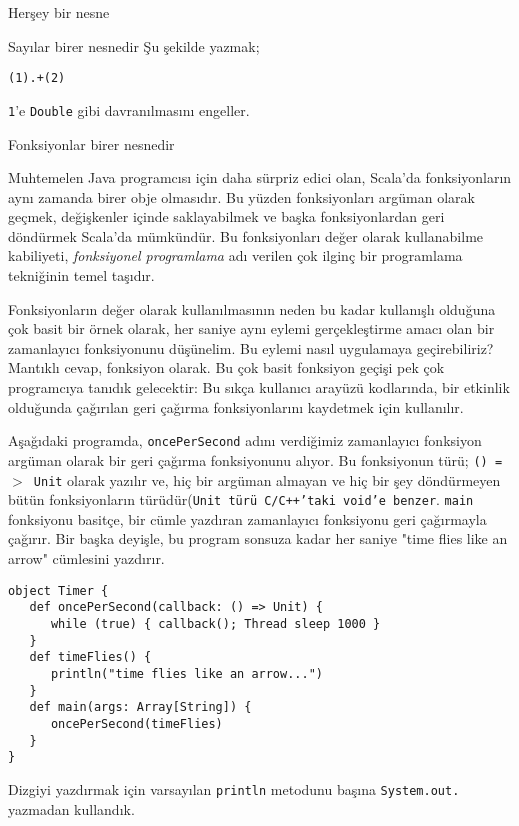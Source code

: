 \documentclass[10pt,a4paper]{book}
\begin{document}
\begin{chapter}{Herşey bir nesne}
\begin{section}{Sayılar birer nesnedir}
Şu şekilde yazmak;

\begin{verbatim}
(1).+(2)
\end{verbatim}

\texttt{1}'e \texttt{Double} gibi davranılmasını engeller.
\end{section}

\begin{section}{Fonksiyonlar birer nesnedir}

Muhtemelen Java programcısı için daha sürpriz edici olan, Scala'da fonksiyonların aynı zamanda birer obje olmasıdır. Bu yüzden fonksiyonları argüman olarak geçmek, değişkenler içinde saklayabilmek ve başka fonksiyonlardan geri döndürmek Scala'da mümkündür. Bu fonksiyonları değer olarak kullanabilme kabiliyeti, \textit{fonksiyonel programlama} adı verilen çok ilginç bir programlama tekniğinin temel taşıdır.

Fonksiyonların değer olarak kullanılmasının neden bu kadar kullanışlı olduğuna çok basit bir örnek olarak, her saniye aynı eylemi gerçekleştirme amacı olan bir zamanlayıcı fonksiyonunu düşünelim. Bu eylemi nasıl uygulamaya geçirebiliriz? Mantıklı cevap, fonksiyon olarak. Bu çok basit fonksiyon geçişi pek çok programcıya tanıdık gelecektir: Bu sıkça kullanıcı arayüzü kodlarında, bir etkinlik olduğunda çağırılan geri çağırma fonksiyonlarını kaydetmek için kullanılır.

Aşağıdaki programda, \texttt{oncePerSecond} adını verdiğimiz zamanlayıcı fonksiyon argüman olarak bir geri çağırma fonksiyonunu alıyor. Bu fonksiyonun türü; \texttt{() =$>$ Unit} olarak yazılır ve, hiç bir argüman almayan ve hiç bir şey döndürmeyen bütün fonksiyonların türüdür(\texttt{Unit türü C/C++'taki \texttt{void}'e benzer}. \texttt{main} fonksiyonu basitçe, bir cümle yazdıran zamanlayıcı fonksiyonu geri çağırmayla çağırır. Bir başka deyişle, bu program sonsuza kadar her saniye "time flies like an arrow" cümlesini yazdırır.

\begin{verbatim}
object Timer {
   def oncePerSecond(callback: () => Unit) {
      while (true) { callback(); Thread sleep 1000 }
   }
   def timeFlies() {
      println("time flies like an arrow...")
   }
   def main(args: Array[String]) {
      oncePerSecond(timeFlies)
   }
}
\end{verbatim}

Dizgiyi yazdırmak için varsayılan \texttt{println} metodunu başına \texttt{System.out.} yazmadan kullandık.


\end{section}
\end{chapter}
\end{document}
